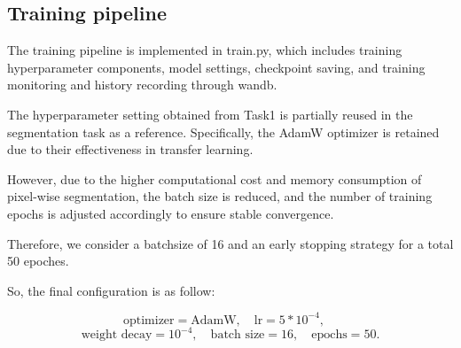 \subsection{Training pipeline}
The training pipeline is implemented in train.py, which includes training hyperparameter components, model settings, checkpoint saving, and training monitoring and history recording through wandb.


The hyperparameter setting obtained from Task1 is partially reused in the segmentation task as a reference. Specifically, the AdamW optimizer is retained due to their effectiveness in transfer learning.

However, due to the higher computational cost and memory consumption of pixel-wise segmentation, the batch size is reduced, and the number of training epochs is adjusted accordingly to ensure stable convergence.

Therefore, we consider a batchsize of 16 and an early stopping strategy for a total 50 epoches.


So, the final configuration is as follow:

\[
\text{optimizer} = \text{AdamW}, \quad
\text{lr} = 5*10^{-4}, \quad
\]
\[
\text{weight decay} = 10^{-4}, \quad
\text{batch size} = 16, \quad
\text{epochs} = 50.
\]
